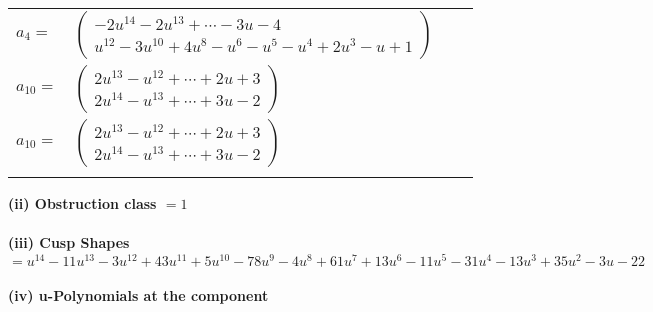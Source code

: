 \documentclass[1p]{elsarticle_modified}
\theoremstyle{definition}
\begin{document}
\begin{tabular}{m{7pt} m{180pt} m{7pt} m{180pt} }
\flushright $a_{4}=$&$\begin{pmatrix}-2 u^{14}-2 u^{13}+\cdots-3 u-4\\u^{12}-3 u^{10}+4 u^8- u^6- u^5- u^4+2 u^3- u+1\end{pmatrix}$ \\
\flushright $a_{10}=$&$\begin{pmatrix}2 u^{13}- u^{12}+\cdots+2 u+3\\2 u^{14}- u^{13}+\cdots+3 u-2\end{pmatrix}$\\ \flushright $a_{10}=$&$\begin{pmatrix}2 u^{13}- u^{12}+\cdots+2 u+3\\2 u^{14}- u^{13}+\cdots+3 u-2\end{pmatrix}$\\&\end{tabular}
\flushleft \textbf{(ii) Obstruction class $= 1$}\\~\\
\flushleft \textbf{(iii) Cusp Shapes $= u^{14}-11 u^{13}-3 u^{12}+43 u^{11}+5 u^{10}-78 u^9-4 u^8+61 u^7+13 u^6-11 u^5-31 u^4-13 u^3+35 u^2-3 u-22$}\\~\\
\newpage\renewcommand{\arraystretch}{1}
\flushleft \textbf{(iv) u-Polynomials at the component}\newline \\
\end{document}
